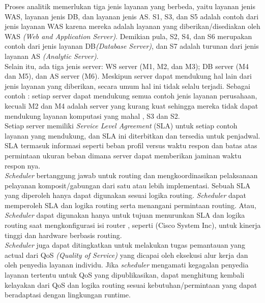 Proses analitik memerlukan tiga jenis layanan yang berbeda, yaitu layanan jenis WAS, layanan jenis DB, dan layanan jenis AS. S1, S3, dan S5 adalah contoh dari jenis layanan WAS karena mereka adalah layanan yang diberikan/disediakan oleh WAS \textit{(Web and Application Server)}. Demikian pula, S2, S4, dan S6 merupakan contoh dari jenis layanan DB\textit{(Database Server)}, dan S7 adalah turunan dari jenis layanan AS \textit{(Analytic Server)}.\\
\tab Selain itu, ada tiga jenis server: WS server (M1, M2, dan M3); DB server (M4 dan M5), dan AS server (M6). Meskipun server dapat mendukung hal lain dari jenis layanan yang diberikan, secara umum hal ini tidak selalu terjadi. Sebagai contoh : setiap server dapat mendukung semua contoh jenis layanan perusahaan, kecuali M2 dan M4 adalah server yang kurang kuat sehingga mereka tidak dapat mendukung layanan komputasi yang mahal , S3 dan S2.\\
\tab Setiap server memiliki \textit{Service Level Agreement} (SLA) untuk setiap contoh layanan yang mendukung, dan SLA ini diterbitkan dan tersedia untuk penjadwal. SLA termasuk informasi seperti beban profil versus waktu respon dan batas atas permintaan ukuran beban  dimana server dapat memberikan jaminan waktu respon nya.\\
\textit{Scheduler} bertanggung jawab untuk routing dan mengkoordinasikan pelaksanaan pelayanan komposit/gabungan dari satu atau lebih implementasi. Sebuah SLA yang diperoleh hanya dapat digunakan sesuai logika routing. \textit{Scheduler} dapat memperoleh SLA dan logika routing serta menangani permintaan routing. Atau, \textit{Scheduler} dapat digunakan hanya untuk tujuan menurunkan SLA dan logika routing saat mengkonfigurasi isi router , seperti  (Cisco System  Inc), untuk kinerja tinggi dan hardware berbasis routing.\\
\tab \textit{Scheduler} juga dapat ditingkatkan untuk melakukan tugas pemantauan yang actual dari QoS \textit{(Quality of Service)} yang dicapai oleh eksekusi alur kerja dan oleh penyedia layanan individu. Jika \textit{scheduler} mengamati kegagalan penyedia layanan tertentu untuk QoS yang dipublikasikan, dapat menghitung kembali kelayakan dari QoS dan logika routing sesuai kebutuhan/permintaan yang dapat   beradaptasi dengan lingkungan  runtime.
